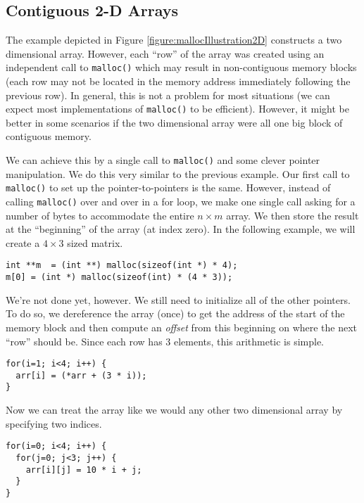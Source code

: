 \subsection{Contiguous 2-D Arrays}
\label{subsection:contiguous2DArrays}

The example depicted in Figure \ref{figure:mallocIllustration2D} 
constructs a two dimensional array.  However, each ``row'' of the
array was created using an independent call to \texttt{malloc()}
which may result in non-contiguous memory blocks (each row may not
be located in the memory address immediately following the previous
row).  In general, this is not a problem for most situations
(we can expect most implementations of \texttt{malloc()}
to be efficient).  However, it might be better in some scenarios if 
the two dimensional array were all one big block of contiguous memory.  

We can achieve this by a single call to \texttt{malloc()} and
some clever pointer manipulation.  We do this very similar to the
previous example.  Our first call to \texttt{malloc()} to set
up the pointer-to-pointers is the same.  However, instead of calling
\texttt{malloc()} over and over in a for loop, we make one
single call asking for a number of bytes to accommodate the entire
$n \times m$ array.  We then store the result at the ``beginning''
of the array (at index zero).  In the following example, we will
create a $4 \times 3$ sized matrix.

\begin{verbatim}
int **m  = (int **) malloc(sizeof(int *) * 4);
m[0] = (int *) malloc(sizeof(int) * (4 * 3));
\end{verbatim}

We're not done yet, however.  We still need to initialize all of the
other pointers.  To do so, we dereference the array (once) to get
the address of the start of the memory block and then compute
an \emph{offset} from this beginning on where the next ``row'' should
be.  Since each row has 3 elements, this arithmetic
is simple.

\begin{verbatim}
for(i=1; i<4; i++) {
  arr[i] = (*arr + (3 * i));
}
\end{verbatim}

Now we can treat the array like we would any other two dimensional array
by specifying two indices.

\begin{verbatim}
for(i=0; i<4; i++) {
  for(j=0; j<3; j++) {
    arr[i][j] = 10 * i + j;
  }
}
\end{verbatim}

